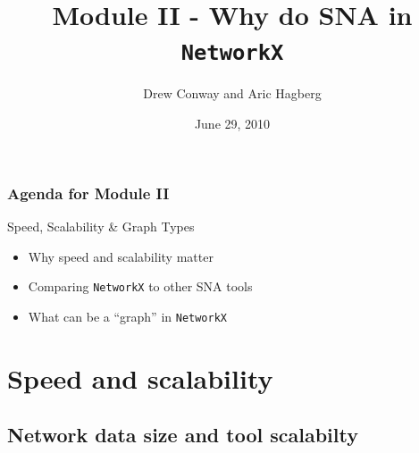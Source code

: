 \documentclass[xcolor=dvipsnames, 9pt]{beamer}
\title{Module II - Why do SNA in \texttt{NetworkX}}
\author{Drew Conway and Aric Hagberg}
\date{June 29, 2010}
\begin{document}
 

\begin{frame}[plain]
  \titlepage  
\end{frame}

\begin{frame}
	\frametitle{Agenda for Module II}
	Speed, Scalability \& Graph Types
	\begin{itemize}
	   \item Why speed and scalability matter
	   \item Comparing \texttt{NetworkX} to other SNA tools 
	   \item What can be a ``graph'' in \texttt{NetworkX}
	\end{itemize}
\end{frame}

\section{Speed and scalability} %
\label{sec:speed_and_scalability}

\subsection{Network data size and tool scalabilty} %
\label{sub:network_data_size_and_tool_scalabilty}
\end{document}
